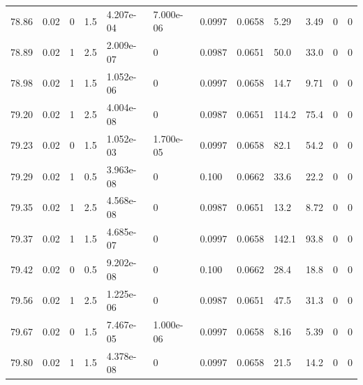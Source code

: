 \documentclass[preview]{standalone}
\begin{document}
{{{{{{{{{{{{{{{{{{\begin{tabular}{L{1.2cm}C{1.2cm} C{0.3cm}C{0.5cm} C{1.4cm}C{1.4cm} C{1.4cm}C{1.4cm} C{1.6cm}C{1.6cm} C{1.6cm}C{1.6cm}}
  78.86  &  0.02  & 0     & 1.5 &  4.207e-04  & 7.000e-06  &  0.0997&   0.0658& 5.29 & 3.49   &  0 & 0  \\ 
  78.89  &  0.02  & 1     & 2.5 &  2.009e-07  & 0  &  0.0987&   0.0651& 50.0 & 33.0   &  0 & 0  \\ 
  78.98  &  0.02  & 1     & 1.5 &  1.052e-06  & 0  &  0.0997&   0.0658& 14.7 & 9.71   &  0 & 0  \\ 
  79.20  &  0.02  & 1     & 2.5 &  4.004e-08  & 0  &  0.0987&   0.0651& 114.2 & 75.4   &  0 & 0  \\ 
  79.23  &  0.02  & 0     & 1.5 &  1.052e-03  & 1.700e-05  &  0.0997&   0.0658& 82.1 & 54.2   &  0 & 0  \\ 
  79.29  &  0.02  & 1     & 0.5 &  3.963e-08  & 0  &  0.100&   0.0662& 33.6 & 22.2   &  0 & 0  \\ 
  79.35  &  0.02  & 1     & 2.5 &  4.568e-08  & 0  &  0.0987&   0.0651& 13.2 & 8.72   &  0 & 0  \\ 
  79.37  &  0.02  & 1     & 1.5 &  4.685e-07  & 0  &  0.0997&   0.0658& 142.1 & 93.8   &  0 & 0  \\ 
  79.42  &  0.02  & 0     & 0.5 &  9.202e-08  & 0  &  0.100&   0.0662& 28.4 & 18.8   &  0 & 0  \\ 
  79.56  &  0.02  & 1     & 2.5 &  1.225e-06  & 0  &  0.0987&   0.0651& 47.5 & 31.3   &  0 & 0  \\ 
  79.67  &  0.02  & 0     & 1.5 &  7.467e-05  & 1.000e-06  &  0.0997&   0.0658& 8.16 & 5.39   &  0 & 0  \\ 
  79.80  &  0.02  & 1     & 1.5 &  4.378e-08  & 0  &  0.0997&   0.0658& 21.5 & 14.2   &  0 & 0  \\ 
\hline 
\end{tabular} 

}}}}}}}}}}}}}}}}}}
\end{document}
